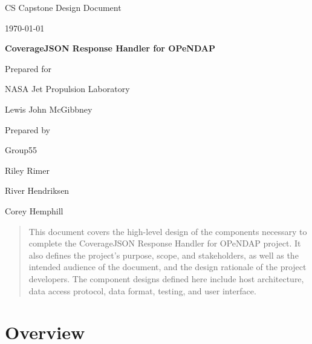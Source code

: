 \documentclass[onecolumn, draftclsnofoot,10pt, compsoc]{IEEEtran}
\def \CapstoneTeamNumber{55}
\def \GroupMemberOne{Riley Rimer}
\def \GroupMemberTwo{River Hendriksen}
\def \GroupMemberThree{Corey Hemphill}
\def \CapstoneProjectName{CoverageJSON Response Handler for OPeNDAP}
\def \CapstoneSponsorCompany{NASA Jet Propulsion Laboratory}
\def \CapstoneSponsorPerson{Lewis John McGibbney}
\def \DocType{	%
				Design Document
				}
\newcommand{\NameSigPair}[1]{\par
\makebox[2.75in][r]{#1} \hfil 	\makebox[3.25in]{\makebox[2.25in]{\hrulefill} \hfill		\makebox[.75in]{\hrulefill}}
\par\vspace{-12pt} \textit{\tiny\noindent
\makebox[2.75in]{} \hfil	\makebox[3.25in]{\makebox[2.25in][r]{Signature} \hfill	\makebox[.75in][r]{Date}}}}
\renewcommand{\NameSigPair}[1]{#1}
\begin{document}
\begin{titlepage}
    \begin{singlespace}
        \hfill    
        \par\vspace{.2in}
        \centering
        \scshape{
            \huge CS Capstone \DocType \par
            {\large\today}\par
            \vspace{.5in}
            \textbf{\Huge\CapstoneProjectName}\par
                        \vspace{.5in}

            \vfill
            {\large Prepared for}\par
            \Huge \CapstoneSponsorCompany\par
            \vspace{5pt}
            {\Large\NameSigPair{\CapstoneSponsorPerson}\par}
            {\large Prepared by }\par
            Group\CapstoneTeamNumber\par
            \vspace{5pt}
            {\Large
                \NameSigPair{\GroupMemberOne}\par
                \NameSigPair{\GroupMemberTwo}\par
                \NameSigPair{\GroupMemberThree}\par
            }
            \vspace{20pt}
        }
        \begin{abstract}
        	This document covers the high-level design of the components necessary to complete the CoverageJSON Response Handler for OPeNDAP project. It also defines the project's purpose, scope, and stakeholders, as well as the intended audience of the document, and the design rationale of the project developers. The component designs defined here include host architecture, data access protocol, data format, testing, and user interface.
        \end{abstract}     
    \end{singlespace}
\end{titlepage}
\newpage
{}
\tableofcontents
\clearpage
\section{Overview}
\end{document}
